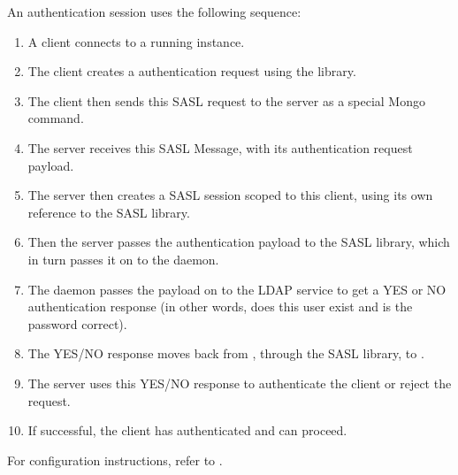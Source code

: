 \documentclass[letterpaper,10pt,english]{sphinxmanual}
\begin{document}
\sphinxAtStartPar
An authentication session uses the following sequence:
\begin{enumerate}
%
\item {} 
\sphinxAtStartPar
A  client connects to a running  instance.

\item {} 
\sphinxAtStartPar
The client creates a  authentication request
using the  library.

\item {} 
\sphinxAtStartPar
The client then sends this SASL request to the server
as a special Mongo command.

\item {} 
\sphinxAtStartPar
The  server receives this SASL Message,
with its authentication request payload.

\item {} 
\sphinxAtStartPar
The server then creates a SASL session scoped to this client,
using its own reference to the SASL library.

\item {} 
\sphinxAtStartPar
Then the server passes the authentication payload to the SASL library,
which in turn passes it on to the  daemon.

\item {} 
\sphinxAtStartPar
The  daemon passes the payload on to the LDAP service
to get a YES or NO authentication response
(in other words, does this user exist and is the password correct).

\item {} 
\sphinxAtStartPar
The YES/NO response moves back from ,
through the SASL library, to .

\item {} 
\sphinxAtStartPar
The  server uses this YES/NO response
to authenticate the client or reject the request.

\item {} 
\sphinxAtStartPar
If successful, the client has authenticated and can proceed.

\end{enumerate}

\sphinxAtStartPar
For configuration instructions, refer to {\hyperref[\detokenize{sasl-auth:sasl}]{}}.
\end{document}
